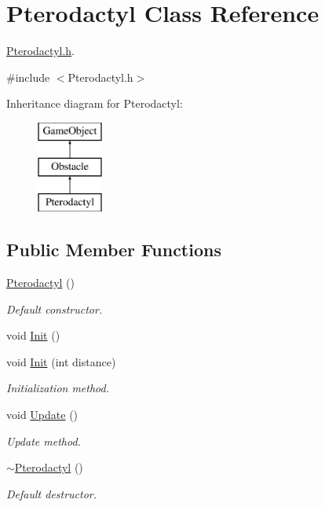 \hypertarget{class_pterodactyl}{}\section{Pterodactyl Class Reference}
\label{class_pterodactyl}


\mbox{\hyperlink{_pterodactyl_8h}{Pterodactyl.\+h}}.  




{\ttfamily \#include $<$Pterodactyl.\+h$>$}

Inheritance diagram for Pterodactyl\+:\begin{figure}[H]
\begin{center}
\leavevmode
\includegraphics[height=3.000000cm]{class_pterodactyl}
\end{center}
\end{figure}
\subsection*{Public Member Functions}
\begin{DoxyCompactItemize}
\item 
\mbox{\hyperlink{class_pterodactyl_ae667ed30c8198eae8027bf34b2f90034}{Pterodactyl}} ()
\begin{DoxyCompactList}\small\item\em Default constructor. \end{DoxyCompactList}\item 
void \mbox{\hyperlink{class_pterodactyl_abb1effe2b67ceabf7494d3f104fc20b5}{Init}} ()
\item 
void \mbox{\hyperlink{class_pterodactyl_a55037eb1d5ed42027e9c0cf9891b3f70}{Init}} (int distance)
\begin{DoxyCompactList}\small\item\em Initialization method. \end{DoxyCompactList}\item 
void \mbox{\hyperlink{class_pterodactyl_a8ab71be091355092560c40746bf53bef}{Update}} ()
\begin{DoxyCompactList}\small\item\em Update method. \end{DoxyCompactList}\item 
\mbox{\hyperlink{class_pterodactyl_a57c101dcc34661693bb424770d590c0a}{$\sim$\+Pterodactyl}} ()
\begin{DoxyCompactList}\small\item\em Default destructor. \end{DoxyCompactList}\end{DoxyCompactItemize}
